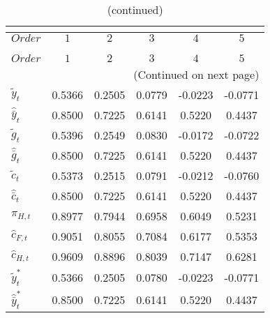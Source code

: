  
\begin{center}
\begin{longtable}{lccccc} 
\caption{COEFFICIENTS OF AUTOCORRELATION}\\
 \label{Table:th_autocorr_matrix}\\
\toprule 
$Order                $	 & 	 $          1$	 & 	 $          2$	 & 	 $          3$	 & 	 $          4$	 & 	 $          5$\\
\midrule \endfirsthead 
\caption{(continued)}\\
 \toprule \\ 
$Order                $	 & 	 $          1$	 & 	 $          2$	 & 	 $          3$	 & 	 $          4$	 & 	 $          5$\\
\midrule \endhead 
\midrule \multicolumn{6}{r}{(Continued on next page)} \\ \bottomrule \endfoot 
\bottomrule \endlastfoot 
${\tilde y_t}         $	 & 	     0.5366	 & 	     0.2505	 & 	     0.0779	 & 	    -0.0223	 & 	    -0.0771 \\ 
${\hat {\bar y}_t}    $	 & 	     0.8500	 & 	     0.7225	 & 	     0.6141	 & 	     0.5220	 & 	     0.4437 \\ 
${\tilde g_t}         $	 & 	     0.5396	 & 	     0.2549	 & 	     0.0830	 & 	    -0.0172	 & 	    -0.0722 \\ 
${\hat {\bar g}_t}    $	 & 	     0.8500	 & 	     0.7225	 & 	     0.6141	 & 	     0.5220	 & 	     0.4437 \\ 
${\tilde c_t}         $	 & 	     0.5373	 & 	     0.2515	 & 	     0.0791	 & 	    -0.0212	 & 	    -0.0760 \\ 
${\hat {\bar c}_t}    $	 & 	     0.8500	 & 	     0.7225	 & 	     0.6141	 & 	     0.5220	 & 	     0.4437 \\ 
${\pi_{H,t}}          $	 & 	     0.8977	 & 	     0.7944	 & 	     0.6958	 & 	     0.6049	 & 	     0.5231 \\ 
${\hat c_{F,t}}       $	 & 	     0.9051	 & 	     0.8055	 & 	     0.7084	 & 	     0.6177	 & 	     0.5353 \\ 
${\hat c_{H,t}}       $	 & 	     0.9609	 & 	     0.8896	 & 	     0.8039	 & 	     0.7147	 & 	     0.6281 \\ 
${\tilde y_t^*}       $	 & 	     0.5366	 & 	     0.2505	 & 	     0.0780	 & 	    -0.0223	 & 	    -0.0771 \\ 
${\hat {\bar y}_t^*}  $	 & 	     0.8500	 & 	     0.7225	 & 	     0.6141	 & 	     0.5220	 & 	     0.4437 \\ 

\end{longtable}
\end{center}
